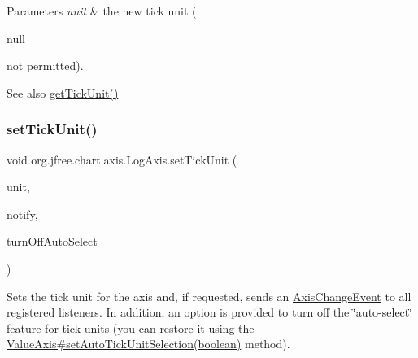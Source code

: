 \begin{DoxyParams}{Parameters}
{\em unit} & the new tick unit (
\begin{DoxyCode}
null 
\end{DoxyCode}
 not permitted).\\
\hline
\end{DoxyParams}
\begin{DoxySeeAlso}{See also}
\mbox{\hyperlink{classorg_1_1jfree_1_1chart_1_1axis_1_1_log_axis_a25a06c24b1103fea5c074518a283fef2}{get\+Tick\+Unit()}} 
\end{DoxySeeAlso}
\mbox{\label{classorg_1_1jfree_1_1chart_1_1axis_1_1_log_axis_a6af77a7f0a87df65e5a769098f7b4be1}} 
\subsubsection{\texorpdfstring{set\+Tick\+Unit()}{setTickUnit()}\hspace{0.1cm}{\footnotesize\ttfamily [2/2]}}
{\footnotesize\ttfamily void org.\+jfree.\+chart.\+axis.\+Log\+Axis.\+set\+Tick\+Unit (\begin{DoxyParamCaption}\item[{\mbox{\hyperlink{classorg_1_1jfree_1_1chart_1_1axis_1_1_number_tick_unit}{Number\+Tick\+Unit}}}]{unit,  }\item[{boolean}]{notify,  }\item[{boolean}]{turn\+Off\+Auto\+Select }\end{DoxyParamCaption})}

Sets the tick unit for the axis and, if requested, sends an \mbox{\hyperlink{}{Axis\+Change\+Event}} to all registered listeners. In addition, an option is provided to turn off the \char`\"{}auto-\/select\char`\"{} feature for tick units (you can restore it using the \mbox{\hyperlink{classorg_1_1jfree_1_1chart_1_1axis_1_1_value_axis_a7366393f75b07420136f449d351deb08}{Value\+Axis\#set\+Auto\+Tick\+Unit\+Selection(boolean)}} method).


